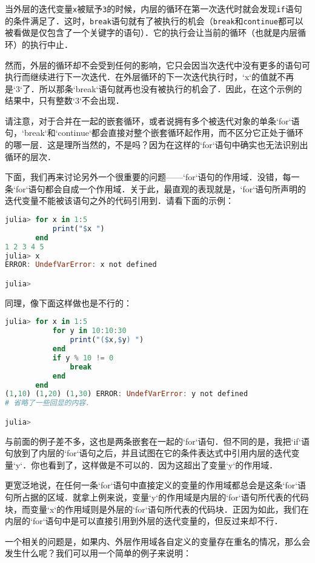 当外层的迭代变量\verb|x|被赋予\verb|3|的时候，内层的循环在第一次迭代时就会发现\verb|if|语句的条件满足了．这时，\verb|break|语句就有了被执行的机会（\verb|break|和\verb|continue|都可以被看做是仅包含了一个关键字的语句）．它的执行会让当前的循环（也就是内层循环）的执行中止．

然而，外层的循环却不会受到任何的影响，它只会因当次迭代中没有更多的语句可执行而继续进行下一次迭代．在外层循环的下一次迭代执行时，`x`的值就不再是`3`了．所以那条`break`语句就再也没有被执行的机会了．因此，在这个示例的结果中，只有整数`3`不会出现．

请注意，对于合并在一起的嵌套循环，或者说拥有多个被迭代对象的单条`for`语句，`break`和`continue`都会直接对整个嵌套循环起作用，而不区分它正处于循环的哪一层．这是理所当然的，不是吗？因为在这样的`for`语句中确实也无法识别出循环的层次．

下面，我们再来讨论另外一个很重要的问题——`for`语句的作用域．没错，每一条`for`语句都会自成一个作用域．关于此，最直观的表现就是，`for`语句所声明的迭代变量不能被该语句之外的代码引用到．请看下面的示例：

\begin{lstlisting}[language=julia]
julia> for x in 1:5
           print("$x ")
       end
1 2 3 4 5 
julia> x
ERROR: UndefVarError: x not defined

julia> 
\end{lstlisting}

同理，像下面这样做也是不行的：
\begin{lstlisting}[language=julia]
julia> for x in 1:5
           for y in 10:10:30
               print("($x,$y) ")
           end
           if y % 10 != 0 
               break
           end
       end
(1,10) (1,20) (1,30) ERROR: UndefVarError: y not defined
# 省略了一些回显的内容．

julia> 
\end{lstlisting}

与前面的例子差不多，这也是两条嵌套在一起的`for`语句．但不同的是，我把`if`语句放到了内层的`for`语句之后，并且试图在它的条件表达式中引用内层的迭代变量`y`．你也看到了，这样做是不可以的．因为这超出了变量`y`的作用域．

更宽泛地说，在任何一条`for`语句中直接定义的变量的作用域都总会是这条`for`语句所占据的区域．就拿上例来说，变量`y`的作用域是内层的`for`语句所代表的代码块，而变量`x`的作用域则是外层的`for`语句所代表的代码块．正因为如此，我们在内层的`for`语句中是可以直接引用到外层的迭代变量的，但反过来却不行．

一个相关的问题是，如果内、外层作用域各自定义的变量存在重名的情况，那么会发生什么呢？我们可以用一个简单的例子来说明：

